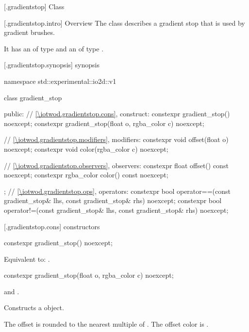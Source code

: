  [\iotwod.gradientstop] {Class }

 [\iotwod.gradientstop.intro] {Overview}
\pnum
{}%
The class  describes a gradient stop that is used by gradient brushes.

\pnum
It has an  of type  and an  of type .

 [\iotwod.gradientstop.synopsis] { synopsis}

\begin{codeblock}
namespace std::experimental::io2d::v1 {
  class gradient_stop {
  public:
    // \ref{\iotwod.gradientstop.cons}, construct:
    constexpr gradient_stop() noexcept;
    constexpr gradient_stop(float o, rgba_color c) noexcept;
    
    // \ref{\iotwod.gradientstop.modifiers}, modifiers:
    constexpr void offset(float o) noexcept;
    constexpr void color(rgba_color c) noexcept;
	
    // \ref{\iotwod.gradientstop.observers}, observers:
    constexpr float offset() const noexcept;
    constexpr rgba_color color() const noexcept;
  };
  // \ref{\iotwod.gradientstop.ops}, operators:
  constexpr bool operator==(const gradient_stop& lhs, const gradient_stop& rhs)
    noexcept;
  constexpr bool operator!=(const gradient_stop& lhs, const gradient_stop& rhs)
    noexcept;
}
\end{codeblock}

 [\iotwod.gradientstop.cons] { constructors}

%
\begin{itemdecl}
constexpr gradient_stop() noexcept;
\end{itemdecl}
\begin{itemdescr}
\pnum
\effects
Equivalent to: .
\end{itemdescr}

%
\begin{itemdecl}
constexpr gradient_stop(float o, rgba_color c) noexcept;
\end{itemdecl}
\begin{itemdescr}
\pnum
\requires
{} and .

\pnum
\effects
Constructs a  object.

\pnum
The offset is  rounded to the nearest multiple of . The offset color is .
\end{itemdescr}


